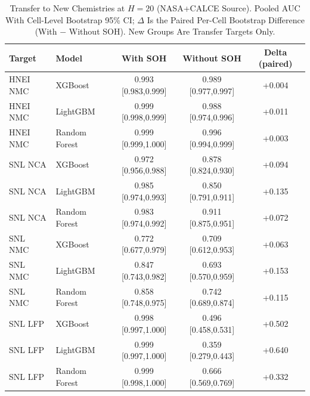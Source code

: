 \documentclass[11pt,a4paper]{article}
\begin{document}
\begin{table}[!t]
\caption{Transfer to New Chemistries at $H{=}20$ (NASA+CALCE Source). Pooled AUC With Cell-Level Bootstrap 95\% CI; $\Delta$ Is the Paired Per-Cell Bootstrap Difference (With $-$ Without SOH). New Groups Are Transfer Targets Only.}
\label{tab:crosschemnew}
\centering
\footnotesize
\begin{tabular}{llccc}
\toprule
\textbf{Target} & \textbf{Model} & \textbf{With SOH} & \textbf{Without SOH} & \textbf{Delta (paired)}\\
\midrule
HNEI NMC & XGBoost & 0.993 [0.983,0.999] & 0.989 [0.977,0.997] & +0.004 \\
HNEI NMC & LightGBM & 0.999 [0.998,0.999] & 0.988 [0.974,0.996] & +0.011 \\
HNEI NMC & Random Forest & 0.999 [0.999,1.000] & 0.996 [0.994,0.999] & +0.003 \\
SNL NCA & XGBoost & 0.972 [0.956,0.988] & 0.878 [0.824,0.930] & +0.094 \\
SNL NCA & LightGBM & 0.985 [0.974,0.993] & 0.850 [0.791,0.911] & +0.135 \\
SNL NCA & Random Forest & 0.983 [0.974,0.992] & 0.911 [0.875,0.951] & +0.072 \\
SNL NMC & XGBoost & 0.772 [0.677,0.979] & 0.709 [0.612,0.953] & +0.063 \\
SNL NMC & LightGBM & 0.847 [0.743,0.982] & 0.693 [0.570,0.959] & +0.153 \\
SNL NMC & Random Forest & 0.858 [0.748,0.975] & 0.742 [0.689,0.874] & +0.115 \\
SNL LFP & XGBoost & 0.998 [0.997,1.000] & 0.496 [0.458,0.531] & +0.502 \\
SNL LFP & LightGBM & 0.999 [0.997,1.000] & 0.359 [0.279,0.443] & +0.640 \\
SNL LFP & Random Forest & 0.999 [0.998,1.000] & 0.666 [0.569,0.769] & +0.332 \\
\bottomrule
\end{tabular}
\end{table}
\end{document}
